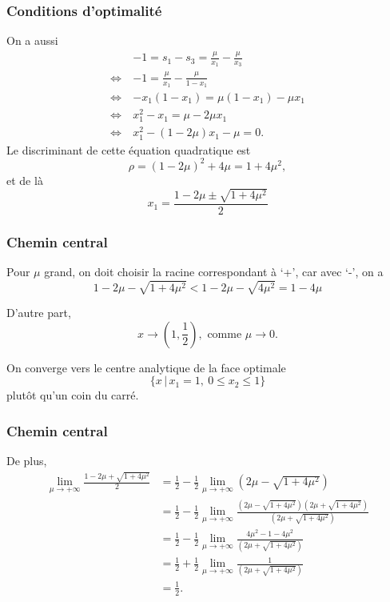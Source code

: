 \documentclass[usepdftitle=false, aspectratio=169]{beamer}
\begin{document}
\begin{frame}
\frametitle{Conditions d'optimalité}

On a aussi
\begin{align*}
& -1 = s_1 - s_3 = \frac{\mu}{x_1} - \frac{\mu}{x_3} \\
\Leftrightarrow\ & -1 = \frac{\mu}{x_1} - \frac{\mu}{1-x_1} \\
\Leftrightarrow\ & -x_1(1-x_1) = \mu(1-x_1) - \mu x_1 \\
\Leftrightarrow\ & x_1^2 - x_1 = \mu - 2\mu x_1 \\
\Leftrightarrow\ & x_1^2 - (1-2\mu) x_1 -\mu = 0.
\end{align*}
Le discriminant de cette équation quadratique est
\[
\rho = (1-2\mu)^2 + 4\mu = 1+ 4\mu^2,
\]
et de là
\[
x_1 = \frac{1-2\mu \pm \sqrt{1+4\mu^2}}{2}
\]

\end{frame}

\begin{frame}
\frametitle{Chemin central}

Pour $\mu$ grand, on doit choisir la racine correspondant à `+', car avec `-', on a
$$
1-2\mu-\sqrt{1+4\mu^2} < 1-2\mu-\sqrt{4\mu^2} = 1-4\mu
$$

D'autre part,
\[
x \rightarrow \left( 1, \frac{1}{2} \right), \mbox{ comme } \mu \rightarrow 0.
\]

\mbox{}

On converge vers le centre analytique de la face optimale
\[
\lbrace x \,|\, x_1 = 1,\ 0 \leq x_2 \leq 1\rbrace
\]
plutôt qu'un coin du carré.

\end{frame}

\begin{frame}
\frametitle{Chemin central}

De plus,
\begin{align*}
\lim_{\mu \rightarrow +\infty} \frac{1-2\mu + \sqrt{1+4\mu^2}}{2}
&= \frac{1}{2} - \frac{1}{2} \lim_{\mu \rightarrow +\infty} \left( 2\mu - \sqrt{1+4\mu^2} \right) \\
&= \frac{1}{2} - \frac{1}{2} \lim_{\mu \rightarrow +\infty} \frac{\left( 2\mu - \sqrt{1+4\mu^2} \right)\left( 2\mu + \sqrt{1+4\mu^2} \right)}{\left( 2\mu + \sqrt{1+4\mu^2} \right)} \\
&= \frac{1}{2} - \frac{1}{2} \lim_{\mu \rightarrow +\infty} \frac{4\mu^2 - 1 -4\mu^2}{\left( 2\mu + \sqrt{1+4\mu^2} \right)} \\
&= \frac{1}{2} + \frac{1}{2} \lim_{\mu \rightarrow +\infty} \frac{1}{\left( 2\mu + \sqrt{1+4\mu^2} \right)} \\
& = \frac{1}{2}.
\end{align*}

\end{frame}
\end{document}
